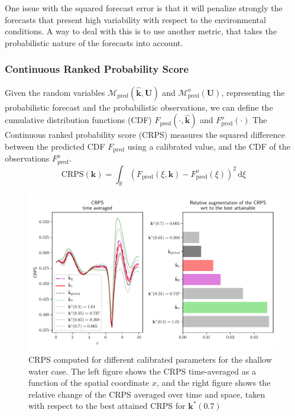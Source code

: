\documentclass[preprint, 1p]{elsarticle}
\newcommand{\kest}{\hat{\mathbf{k}}}
\newlength{\onehalfcolumn}
\begin{document}
One issue with the squared forecast error is that it will penalize strongly the forecasts that present high variability with respect to the environmental conditions.
A way to deal with this is to use another metric, that takes the probabilistic nature of the forecasts into account.


\subsubsection{Continuous Ranked Probability Score}
Given the random variables $\mathcal{M}_{\mathrm{pred}}(\kest, \mathbf{U})$ and $\mathcal{M}_{\mathrm{pred}}^o(\mathbf{U})$, representing the probabilistic forecast and the probabilistic observations, we can define the cumulative distribution functions (CDF) $F_{\mathrm{pred}}(\cdot, \kest)$ and $F^o_{\mathrm{pred}}(\cdot)$
The Continuous ranked probability score (CRPS) measures the squared difference between the predicted CDF $F_{\mathrm{pred}}$ using a calibrated value, and the CDF of the observations $F_{\mathrm{pred}}^o$. 
\begin{equation}
\label{eq:def_crps}
\mathrm{CRPS}(\mathbf{k}) = \int_{\mathbb{R}} (F_{\mathrm{pred}}(\xi,\mathbf{k}) - F^o_{\mathrm{pred}}(\xi))^2 \,\mathrm{d}\xi
\end{equation}

\begin{figure}[!h]
  \centering
  \includegraphics[width=\onehalfcolumn]{Figures/FIG14}
  \caption{CRPS computed for different calibrated parameters for the shallow water case. The left figure shows the CRPS time-averaged as a function of the spatial coordinate $x$, and the right figure shows the relative change of the CRPS averaged over time and space, taken with respect to the best attained CRPS for $\mathbf{k}^*(0.7)$}
\label{fig:forecast_crps}
\end{figure}
\end{document}
